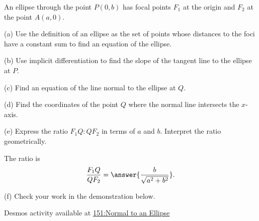 \documentclass{ximera}
\begin{document}
\begin{question} \label{Q:ergbbfrr}
An ellipse through the point $P(0,b)$ has focal points $F_1$ at the origin and $F_2$ at the point $A(a,0)$.

(a) Use the definition of an ellipse as the set of points whose distances to the foci have a constant sum to find an equation of the ellipse.

(b) Use implicit differentiation to find the slope of the tangent line to the ellipse at $P$.

(c) Find an equation of the line normal to the ellipse at $Q$.

(d) Find the coordinates of the point $Q$ where the normal line intersects the $x$-axis.

(e) Express the ratio $F_1 Q : Q F_2$ in terms of $a$ and $b$. Interpret the ratio geometrically.

The ratio is
\[
    \frac{F_1 Q}{Q F_2} = \answer{\frac{b}{\sqrt{a^2+b^2}}} . 
\]

(f) Check your work in the demonstration below.

\begin{onlineOnly}
    \begin{center}
\end{center}
\end{onlineOnly}

Desmos activity available at \href{https://www.desmos.com/calculator/xqywotxxf9}{151:Normal to an Ellipse}



\end{question}
\end{document}
